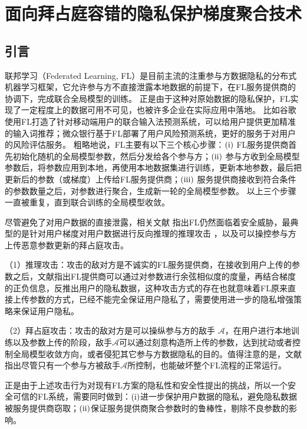 \chapter{面向拜占庭容错的隐私保护梯度聚合技术}

\section{引言}
联邦学习（Federated Learning, FL）是目前主流的注重参与方数据隐私的分布式机器学习框架\cite{kairouz2019advances}，它允许参与方不直接泄露本地数据的前提下，在FL服务提供商的协调下，完成联合全局模型的训练。
正是由于这种对原始数据的隐私保护，FL实现了一定程度上的数据可用不可见，也被许多企业在实际应用中落地。
比如谷歌使用FL打造了针对移动端用户的联合输入法预测系统\cite{hard2018federated}，可以给用户提供更加精准的输入词推荐；微众银行基于FL部署了用户风险预测系统，更好的服务于对用户的风险评估服务。
粗略地说，FL主要有以下三个核心步骤：$(\rm \romannumeral1)$ FL服务提供商首先初始化随机的全局模型参数，然后分发给各个参与方；$(\rm \romannumeral2)$ 参与方收到全局模型参数后，将参数应用到本地，再使用本地数据集进行训练，更新本地参数，最后把更新后的参数（或梯度）上传给FL服务提供商；$(\rm \romannumeral3)$ 服务提供商接收到符合条件的参数数量之后，对参数进行聚合，生成新一轮的全局模型参数。
以上三个步骤一直被重复，直到联合训练的全局模型收敛。

尽管避免了对用户数据的直接泄露，相关文献\cite{kairouz2019advances, mothukuri2021survey, geiping2020inverting} 指出FL仍然面临着安全威胁，最典型的是针对用户梯度对用户数据进行反向推理的推理攻击 \cite{geiping2020inverting}，以及可以操控参与方上传恶意参数更新的拜占庭攻击\cite{kairouz2019advances, mothukuri2021survey}。

（1）推理攻击：攻击的敌对方是不诚实的FL服务提供商，在接收到用户上传的参数之后，文献\cite{geiping2020inverting}指出FL提供商可以通过对参数进行余弦相似度的度量，再结合梯度的正负信息，反推出用户的隐私数据，这种攻击方式的存在也就意味着FL原来直接上传参数的方式，已经不能完全保证用户隐私了，需要使用进一步的隐私增强策略来保证用户隐私。%

（2）拜占庭攻击：攻击的敌对方是可以操纵参与方的敌手 $\mathcal{A}$，在用户进行本地训练以及参数上传的阶段，敌手$\mathcal{A}$可以通过刻意构造所上传的参数，达到扰动或者控制全局模型收敛方向，或者侵犯其它参与方数据隐私的目的\cite{kairouz2019advances}。值得注意的是，文献\cite{blanchard2017machine}指出尽管只有一个参与方被敌手$\mathcal{A}$所控制，也能破坏整个FL流程的正常运行。

正是由于上述攻击行为对现有FL方案的隐私性和安全性提出的挑战，所以一个安全可信的FL系统，需要同时做到：$(\rm \romannumeral1)$进一步保护用户数据的隐私，避免隐私数据被服务提供商窃取；$(\rm \romannumeral2)$保证服务提供商聚合参数时的鲁棒性，剔除不良参数的影响。

